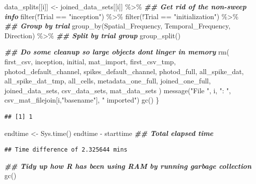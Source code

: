 \documentclass[
]{book}
\newenvironment{Shaded}{\begin{snugshade}}{\end{snugshade}}
\newcommand{\DocumentationTok}[1]{\textcolor[rgb]{0.56,0.35,0.01}{\textbf{\textit{#1}}}}
\newcommand{\FunctionTok}[1]{\textcolor[rgb]{0.00,0.00,0.00}{#1}}
\newcommand{\NormalTok}[1]{#1}
\newcommand{\OtherTok}[1]{\textcolor[rgb]{0.56,0.35,0.01}{#1}}
\newcommand{\SpecialCharTok}[1]{\textcolor[rgb]{0.00,0.00,0.00}{#1}}
\newcommand{\StringTok}[1]{\textcolor[rgb]{0.31,0.60,0.02}{#1}}
\begin{document}
\begin{Shaded}
\begin{Highlighting}[]
\NormalTok{  data\_splits[[i]] }\OtherTok{\textless{}{-}}
\NormalTok{    joined\_data\_sets[[i]] }\SpecialCharTok{\%\textgreater{}\%}
    \DocumentationTok{\#\# Get rid of the non{-}sweep info}
    \FunctionTok{filter}\NormalTok{(}\SpecialCharTok{!}\NormalTok{Trial }\SpecialCharTok{==} \StringTok{"inception"}\NormalTok{) }\SpecialCharTok{\%\textgreater{}\%}
    \FunctionTok{filter}\NormalTok{(}\SpecialCharTok{!}\NormalTok{Trial }\SpecialCharTok{==} \StringTok{"initialization"}\NormalTok{) }\SpecialCharTok{\%\textgreater{}\%}
    \DocumentationTok{\#\# Group by trial}
    \FunctionTok{group\_by}\NormalTok{(Spatial\_Frequency, Temporal\_Frequency, Direction) }\SpecialCharTok{\%\textgreater{}\%}
    \DocumentationTok{\#\# Split by trial group}
    \FunctionTok{group\_split}\NormalTok{()}

  \DocumentationTok{\#\# Do some cleanup so large objects don\textquotesingle{}t linger in memory}
  \FunctionTok{rm}\NormalTok{(}
\NormalTok{    first\_csv, inception, initial, mat\_import, first\_csv\_tmp,}
\NormalTok{    photod\_default\_channel, spikes\_default\_channel, photod\_full,}
\NormalTok{    all\_spike\_dat, all\_spike\_dat\_tmp, all\_cells,}
\NormalTok{    metadata\_one\_full, joined\_one\_full, joined\_data\_sets,}
\NormalTok{    csv\_data\_sets, mat\_data\_sets}
\NormalTok{  )}
  \FunctionTok{message}\NormalTok{(}\StringTok{"File "}\NormalTok{, i, }\StringTok{": "}\NormalTok{, csv\_mat\_filejoin[i,}\StringTok{"basename"}\NormalTok{], }\StringTok{" imported"}\NormalTok{)}
  \FunctionTok{gc}\NormalTok{()}
\NormalTok{\}}
\end{Highlighting}
\end{Shaded}

\begin{verbatim}
## [1] 1
\end{verbatim}

\begin{Shaded}
\begin{Highlighting}[]
\NormalTok{endtime }\OtherTok{\textless{}{-}} \FunctionTok{Sys.time}\NormalTok{()}
\NormalTok{endtime }\SpecialCharTok{{-}}\NormalTok{ starttime }\DocumentationTok{\#\# Total elapsed time}
\end{Highlighting}
\end{Shaded}

\begin{verbatim}
## Time difference of 2.325644 mins
\end{verbatim}

\begin{Shaded}
\begin{Highlighting}[]
\DocumentationTok{\#\# Tidy up how R has been using RAM by running garbage collection}
\FunctionTok{gc}\NormalTok{()}
\end{Highlighting}
\end{Shaded}
\end{document}
